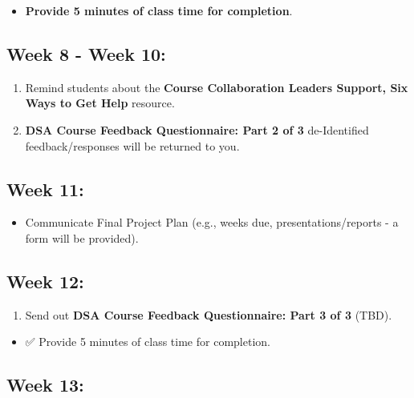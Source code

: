 \documentclass[
]{book}
\providecommand{\tightlist}{%
  \setlength{\itemsep}{0pt}\setlength{\parskip}{0pt}}
\begin{document}
\begin{itemize}
\tightlist
\item
  \textbf{Provide 5 minutes of class time for completion}.
\end{itemize}

\subsection{Week 8 - Week 10:}\label{week-8---week-10}

\begin{enumerate}
\def\labelenumi{\arabic{enumi})}
\item
  Remind students about the \textbf{Course Collaboration Leaders Support, Six Ways to Get Help} resource.
\item
  \textbf{DSA Course Feedback Questionnaire: Part 2 of 3} de-Identified feedback/responses will be returned to you.
\end{enumerate}

\subsection{Week 11:}\label{week-11}

\begin{itemize}
\tightlist
\item
  Communicate Final Project Plan (e.g., weeks due, presentations/reports - a form will be provided).
\end{itemize}

\subsection{Week 12:}\label{week-12}

\begin{enumerate}
\def\labelenumi{\arabic{enumi})}
\tightlist
\item
  Send out { \textbf{DSA Course Feedback Questionnaire: Part 3 of 3} } (TBD).
\end{enumerate}

\begin{itemize}
\tightlist
\item
  ✅ Provide 5 minutes of class time for completion.
\end{itemize}

\subsection{Week 13:}\label{week-13}
\end{document}
